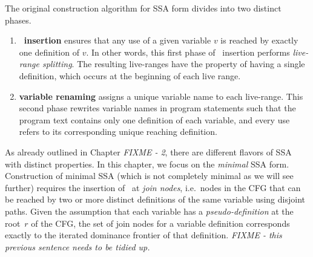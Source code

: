 {%
The original construction algorithm for SSA form \cite{cytron91efficiently}
divides into two distinct phases.
\begin{enumerate}
\item \textbf{\phiop\ insertion} ensures that any use of a given variable $v$ is reached 
by exactly one definition of $v$. In other words, this first phase of \phiop\ insertion performs \textit{live-range splitting}.
The resulting live-ranges have the property of having a single definition, which occurs at the beginning of each live range.
\item \textbf{variable renaming} assigns a unique variable name to each live-range. This second phase rewrites variable names in program statements such that the program text contains only one definition of each variable, and every use refers to its corresponding unique reaching definition.
\end{enumerate}

As already outlined in Chapter \emph{FIXME - 2}, there are different flavors of SSA with distinct properties. In this chapter, we focus on the \textit{minimal} SSA form. Construction of minimal SSA 
(which is not completely minimal as we will see further) 
requires the insertion of \phiops\ at \textit{join nodes},
i.e.\ nodes in the CFG that can be reached by two or more distinct definitions of the same variable using disjoint paths. 
Given the assumption that each variable has a {\em pseudo-definition} at the root~$r$ of the CFG, the set of join nodes for a variable definition corresponds exactly to the iterated dominance frontier of that definition.
\emph{FIXME - this previous sentence needs to be tidied up.}

}
